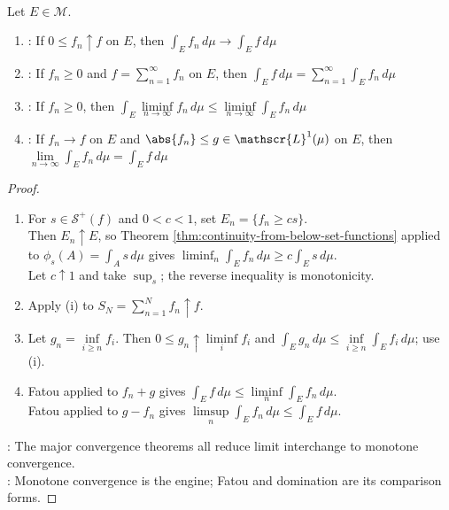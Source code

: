 \begin{theorem} \label{thm:lebesgue-product-main-source-todo}\label{thm:lebesgue-convergence-theorems}\label{thm:dominated-convergence-lebesgue} \\
Let $E\in\mathcal{M}$.
\begin{enumerate}[label=(\roman*)]
\setlength{\itemsep}{0pt}
\item {}: If $0\leq f_n\uparrow f$ on $E$, then $\int_E f_n\,d\mu\to\int_E f\,d\mu$
\item {}: If $f_n\geq0$ and $f=\sum_{n=1}^{\infty}f_n$ on $E$, then $\int_E f\,d\mu=\sum_{n=1}^{\infty}\int_E f_n\,d\mu$
\item {}: If $f_n\geq0$, then $\int_E \liminf\limits_{n\to\infty}f_n\,d\mu\leq\liminf\limits_{n\to\infty}\int_E f_n\,d\mu$
\item {}: If $f_n\to f$ on $E$ and $\abs{f_n}\leq g\in\mathscr{L}^1(\mu)$ on $E$, then $\lim\limits_{n\to\infty}\int_E f_n\,d\mu=\int_E f\,d\mu$
\end{enumerate}
\begin{proof}
\begin{enumerate}[label=(\roman*)]
\setlength{\itemsep}{0pt}
\item For $s\in\mathcal{S}^+(f)$ and $0<c<1$, set $E_n=\{f_n\geq cs\}$.\\
Then $E_n\uparrow E$, so Theorem \ref{thm:continuity-from-below-set-functions} applied to $\phi_s(A)=\int_A s\,d\mu$ gives $\liminf_n\int_E f_n\,d\mu\geq c\int_Es\,d\mu$.\\
Let $c\uparrow1$ and take $\sup_s$; the reverse inequality is monotonicity.
\item Apply (i) to $S_N=\sum\limits_{n=1}^{N}f_n\uparrow f$.
\item Let $g_n=\inf\limits_{i\geq n}f_i$. Then $0\leq g_n\uparrow\liminf\limits_i f_i$ and $\int_Eg_n\,d\mu\leq\inf\limits_{i\geq n}\int_Ef_i\,d\mu$; use (i).
\item Fatou applied to $f_n+g$ gives $\int_E f\,d\mu\leq\liminf\limits_n\int_E f_n\,d\mu$.\\
Fatou applied to $g-f_n$ gives $\limsup\limits_n\int_E f_n\,d\mu\leq\int_E f\,d\mu$.
\end{enumerate}
: The major convergence theorems all reduce limit interchange to monotone convergence.\\
: Monotone convergence is the engine; Fatou and domination are its comparison forms.
\end{proof}
\end{theorem}

